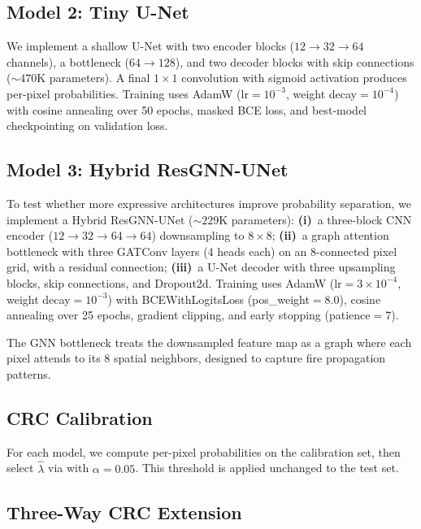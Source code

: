 \documentclass{article}
\begin{document}
\subsection{Model 2: Tiny U-Net}

We implement a shallow U-Net \citep{ronneberger2015unet} with two encoder blocks ($12{\to}32{\to}64$ channels), a bottleneck ($64{\to}128$), and two decoder blocks with skip connections (${\sim}470$K parameters).
A final $1{\times}1$ convolution with sigmoid activation produces per-pixel probabilities.
Training uses AdamW (lr$=10^{-3}$, weight decay$=10^{-4}$) with cosine annealing over 50 epochs, masked BCE loss, and best-model checkpointing on validation loss.

\subsection{Model 3: Hybrid ResGNN-UNet}
\label{sec:resgnn}

To test whether more expressive architectures improve probability separation, we implement a Hybrid ResGNN-UNet (${\sim}229$K parameters):
\textbf{(i)}~a three-block CNN encoder ($12{\to}32{\to}64{\to}64$) downsampling to $8{\times}8$;
\textbf{(ii)}~a graph attention bottleneck with three GATConv layers \citep{veličković2018graph} (4 heads each) on an 8-connected pixel grid, with a residual connection;
\textbf{(iii)}~a U-Net decoder with three upsampling blocks, skip connections, and Dropout2d.
Training uses AdamW (lr$=3{\times}10^{-4}$, weight decay$=10^{-3}$) with BCEWithLogitsLoss (pos\_weight$=8.0$), cosine annealing over 25 epochs, gradient clipping, and early stopping (patience$=$7).

The GNN bottleneck treats the downsampled feature map as a graph where each pixel attends to its 8 spatial neighbors, designed to capture fire propagation patterns.

\subsection{CRC Calibration}
\label{sec:crc-method}

For each model, we compute per-pixel probabilities on the calibration set, then select $\hat{\lambda}$ via  with $\alpha = 0.05$.
This threshold is applied unchanged to the test set.

\subsection{Three-Way CRC Extension}
\label{sec:threeway}
\end{document}
